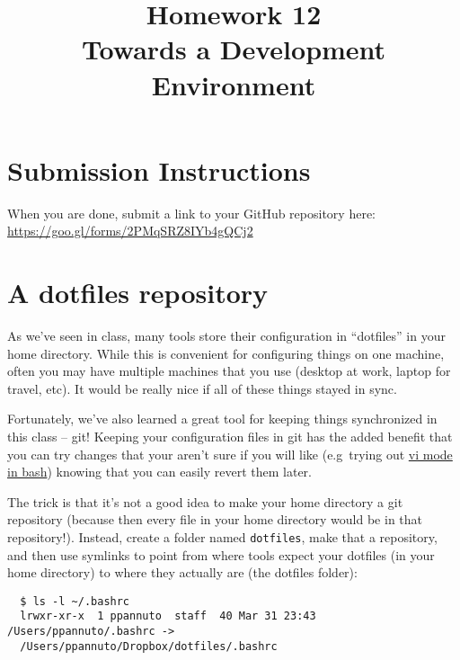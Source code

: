 \documentclass{article}
\begin{document}
\fancyfoot[C]{\color{gray} \thepage~/~\pageref*{LastPage}}
\pagestyle{fancyplain}

\title{\textbf{Homework 12\\Towards a Development Environment}}
\author{\textbf{\color{red}{Due: Wednesday, April 4th, 11:59PM (Hard Deadline)}}}
\date{}
\maketitle


\section*{Submission Instructions}
When you are done, submit a link to your GitHub repository here: \url{https://goo.gl/forms/2PMqSRZ8IYb4gQCj2}


\section{A dotfiles repository}

As we've seen in class, many tools store their configuration in ``dotfiles''
in your home directory. While this is convenient for configuring things on one
machine, often you may have multiple machines that you use (desktop at
work, laptop for travel, etc). It would be really nice if all of these things
stayed in sync.

Fortunately, we've also learned a great tool for keeping things synchronized
in this class -- git! Keeping your configuration files in git has the added
benefit that you can try changes that your aren't sure if you will like
(e.g\ trying out \href{http://blog.sanctum.geek.nz/vi-mode-in-bash/}{vi mode
in bash}) knowing that you can easily revert them later.

The trick is that it's not a good idea to make your home directory a git
repository (because then every file in your home directory would be in that
repository!). Instead, create a folder named \texttt{dotfiles}, make that a
repository, and then use symlinks to point from where tools expect your
dotfiles (in your home directory) to where they actually are (the dotfiles
folder):

\begin{lstlisting}
  $ ls -l ~/.bashrc
  lrwxr-xr-x  1 ppannuto  staff  40 Mar 31 23:43 /Users/ppannuto/.bashrc ->
  /Users/ppannuto/Dropbox/dotfiles/.bashrc
\end{lstlisting}
\end{document}
